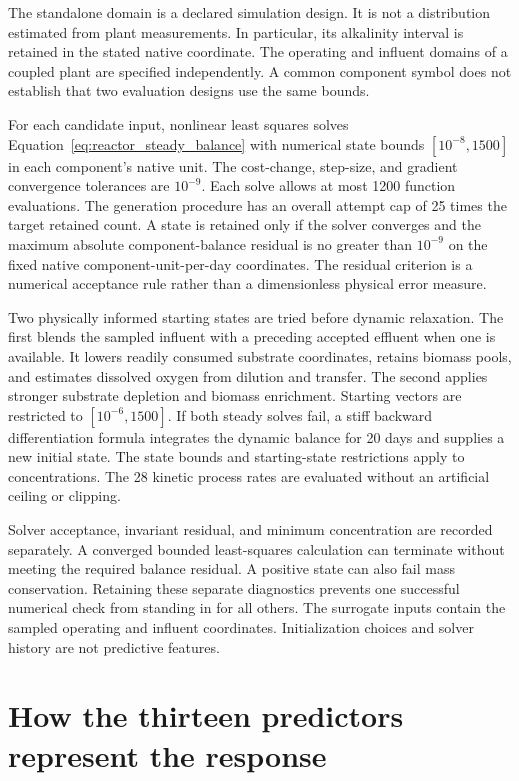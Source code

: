 The standalone domain is a declared simulation design. It is not a distribution estimated from plant measurements. In particular, its alkalinity interval is retained in the stated native coordinate. The operating and influent domains of a coupled plant are specified independently. A common component symbol does not establish that two evaluation designs use the same bounds.

For each candidate input, nonlinear least squares solves Equation~\eqref{eq:reactor_steady_balance} with numerical state bounds $[10^{-8},1500]$ in each component's native unit. The cost-change, step-size, and gradient convergence tolerances are $10^{-9}$. Each solve allows at most 1200 function evaluations. The generation procedure has an overall attempt cap of 25 times the target retained count. A state is retained only if the solver converges and the maximum absolute component-balance residual is no greater than $10^{-9}$ on the fixed native component-unit-per-day coordinates. The residual criterion is a numerical acceptance rule rather than a dimensionless physical error measure.

Two physically informed starting states are tried before dynamic relaxation. The first blends the sampled influent with a preceding accepted effluent when one is available. It lowers readily consumed substrate coordinates, retains biomass pools, and estimates dissolved oxygen from dilution and transfer. The second applies stronger substrate depletion and biomass enrichment. Starting vectors are restricted to $[10^{-6},1500]$. If both steady solves fail, a stiff backward differentiation formula integrates the dynamic balance for 20 days and supplies a new initial state. The state bounds and starting-state restrictions apply to concentrations. The 28 kinetic process rates are evaluated without an artificial ceiling or clipping.

Solver acceptance, invariant residual, and minimum concentration are recorded separately. A converged bounded least-squares calculation can terminate without meeting the required balance residual. A positive state can also fail mass conservation. Retaining these separate diagnostics prevents one successful numerical check from standing in for all others. The surrogate inputs contain the sampled operating and influent coordinates. Initialization choices and solver history are not predictive features.

\section{How the thirteen predictors represent the response}

